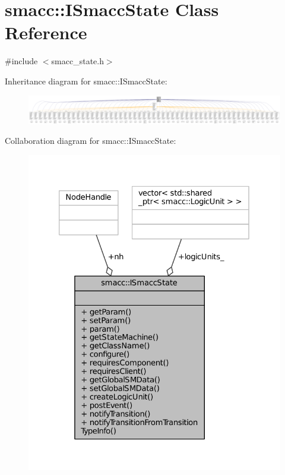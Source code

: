 \hypertarget{classsmacc_1_1ISmaccState}{}\section{smacc\+:\+:I\+Smacc\+State Class Reference}
\label{classsmacc_1_1ISmaccState}


{\ttfamily \#include $<$smacc\+\_\+state.\+h$>$}



Inheritance diagram for smacc\+:\+:I\+Smacc\+State\+:
\nopagebreak
\begin{figure}[H]
\begin{center}
\leavevmode
\includegraphics[width=350pt]{classsmacc_1_1ISmaccState__inherit__graph}
\end{center}
\end{figure}


Collaboration diagram for smacc\+:\+:I\+Smacc\+State\+:
\nopagebreak
\begin{figure}[H]
\begin{center}
\leavevmode
\includegraphics[width=326pt]{classsmacc_1_1ISmaccState__coll__graph}
\end{center}
\end{figure}

